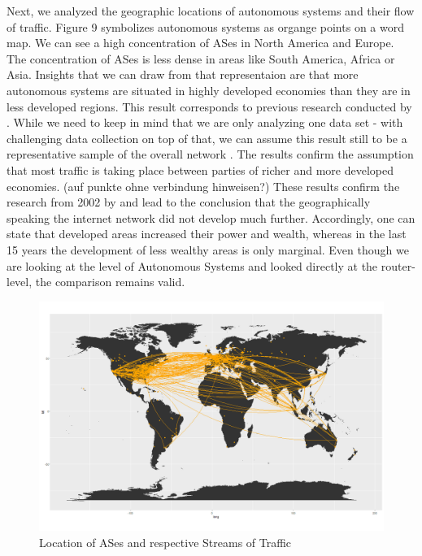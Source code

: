 \documentclass[conference, 11pt]{IEEEtran}
\begin{document}
Next, we analyzed the geographic locations of autonomous systems and their flow of traffic. Figure 9 symbolizes autonomous systems as organge points on a word map. We can see a high concentration of ASes in North America and Europe. The concentration of ASes is less dense in areas like South America, Africa or Asia. Insights that we can draw from that representaion are that more autonomous systems are situated in highly developed economies  than they are in less developed regions. This result corresponds to previous research conducted by \cite{ResearchGeo}. While we need to keep in mind that we are only analyzing one data set - with challenging data collection on top of that, we can assume this result still to be a representative sample of the overall network \cite{CaidaDataCollection}. The results confirm the assumption that most traffic is taking place between parties of richer and more developed economies.  (auf punkte ohne verbindung hinweisen?)
These results confirm the research from 2002 by \cite{geoResearch} and lead to the conclusion that the geographically speaking the internet network did not develop much further. Accordingly, one can state that developed areas increased their power and wealth, whereas in the last 15 years the development of less wealthy areas is only marginal. Even though we are looking at the level of Autonomous Systems and \cite{geoResearch} looked directly at the router-level, the comparison remains valid. \\



\begin{figure}[htbp]
\centerline{\includegraphics[scale=0.2]{Graphics/connectedASes.png}}
\caption{Location of ASes and respective Streams of Traffic}
\label{fig}
\end{figure}
\end{document}
